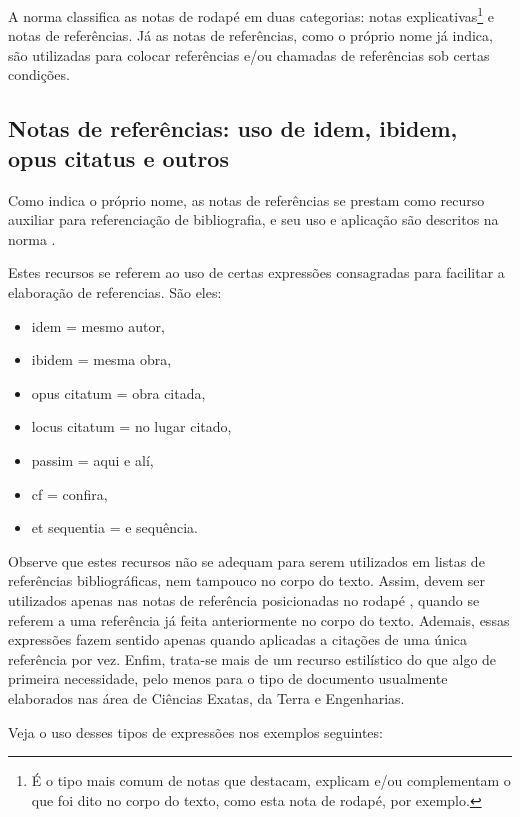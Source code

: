 \begin{apendicesenv}
    A norma  classifica as notas de rodapé em duas categorias: notas explicativas\footnote{É o tipo mais comum de notas que destacam, explicam e/ou complementam o que foi dito no corpo do texto, como esta nota de rodapé, por exemplo.} e notas de referências.
    Já as notas de referências, como o próprio nome já indica, são utilizadas para colocar referências e/ou chamadas de referências sob certas condições.

    \subsection{Notas de referências: uso de idem, ibidem, opus citatus e outros}
    \label{subsec_notas_de_referencias}

    Como indica o próprio nome, as notas de referências se prestam como recurso auxiliar para referenciação de bibliografia, e seu uso e aplicação são descritos na norma .

    Estes recursos se referem ao uso de certas expressões consagradas para facilitar a elaboração de referencias.
    São eles:

    \begin{itemize}
        \item idem = mesmo autor,
        \item ibidem = mesma obra,
        \item opus citatum = obra citada,
        \item locus citatum = no lugar citado,
        \item passim = aqui e alí,
        \item cf = confira,
        \item et sequentia = e sequência.
    \end{itemize}

    Observe que estes recursos não se adequam para serem utilizados em listas de referências bibliográficas, nem tampouco no corpo do texto.
    Assim, devem ser utilizados apenas nas notas de referência posicionadas no rodapé \cite[p.~6]{abnTeX22014c}, quando se referem a uma referência já feita anteriormente no corpo do texto.
    Ademais, essas expressões fazem sentido apenas quando aplicadas a citações de uma única referência por vez.
    Enfim, trata-se mais de um recurso estilístico do que algo de primeira necessidade, pelo menos para o tipo de documento usualmente elaborados nas área de Ciências Exatas, da Terra e Engenharias.

    Veja o uso desses tipos de expressões nos exemplos seguintes:


\end{apendicesenv}
